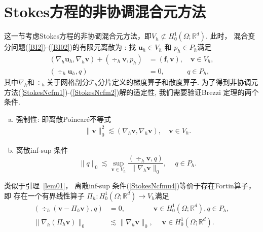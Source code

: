 \section{Stokes方程的非协调混合元方法}

这一节考虑Stokes方程的非协调混合元方法，即$V_h \not\subset H_0^{1}(\Omega; \mathbb{R}^{d})$. 此时，
混合变分问题(\ref{BI2})-(\ref{BI02})的有限元离散为 : 找 $\boldsymbol{u}_h \in  V_h$ 和 $p_h \in P_h$满足
\begin{align}
(\nabla_h\boldsymbol{u}_h,\nabla_h\boldsymbol{v}) + (\div_h\boldsymbol{v},p_h) &=(\boldsymbol{f},\boldsymbol{v}),\quad \boldsymbol{v}\in   V_h,\label{StokesNcfm1}\\
(\div_h\boldsymbol{u}_h,q) &=0, \quad\quad\quad\, q\in P_h,\label{StokesNcfm2}
\end{align}
其中$\nabla_h$和$\div_h$关于网格剖分$\mathcal T_h$分片定义的梯度算子和散度算子.
为了得到非协调元方法(\ref{StokesNcfm1})-(\ref{StokesNcfm2})解的适定性, 我们需要验证Brezzi 定理的两个条件.
\begin{enumerate}[(a)]
\item 强制性: 即离散Poincar\'e不等式
\begin{align}\label{StokesNcfmu3}
\|\boldsymbol{v}\|^{2}_{0}
\lesssim (\nabla_h\boldsymbol{v},\nabla_h\boldsymbol{v}),\quad \boldsymbol{v}\in  V_h.\end{align}
\item 离散inf-sup 条件
\begin{equation}\label{StokesNcfmu4}
\|q\|_{0}\lesssim\sup _{\boldsymbol{v} \in  V_h}
\frac{(\div_h\boldsymbol{v}, q)}{\|\nabla_h\boldsymbol{v}\|_{0}},\quad\, q\in P_h.
\end{equation}
\end{enumerate}

类似于引理~\ref{lem01}，
离散inf-sup 条件(\ref{StokesNcfmu4})等价于存在Fortin算子，即
存在一个有界线性算子 $\Pi_h :H_0^{1}(\Omega; \mathbb{R}^{d})\rightarrow V_h$满足
\begin{align}
 (\div_h(\boldsymbol{v}-\Pi_h\boldsymbol{v}), q) &=0,\qquad\qquad  \boldsymbol{v}\in H_0^{1}(\Omega; \mathbb{R}^{d}),q\in P_{h} ,\label{ncfmk1}\\
 \|\nabla_h(\Pi_h\boldsymbol{v})\|_{0} &\lesssim\|\nabla_h\boldsymbol{v}\|_{0}, \quad\;  \boldsymbol{v}\in H_0^{1}(\Omega; \mathbb{R}^{d}).\label{ncfmk2}
\end{align}


